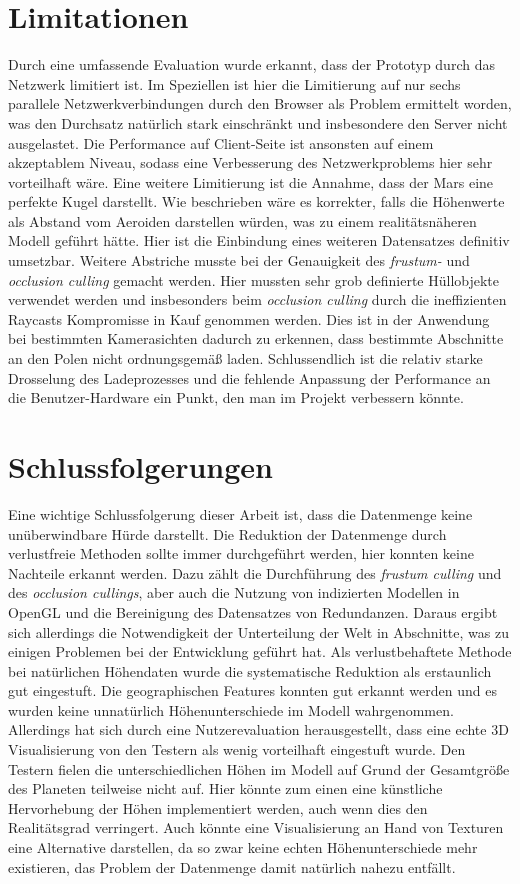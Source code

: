 \section{Limitationen}
Durch eine umfassende Evaluation wurde erkannt, dass der Prototyp durch das Netzwerk limitiert ist. Im Speziellen ist hier die Limitierung auf nur sechs parallele Netzwerkverbindungen durch den Browser als Problem ermittelt worden, was den Durchsatz natürlich stark einschränkt und insbesondere den Server nicht ausgelastet. Die Performance auf Client-Seite ist ansonsten auf einem akzeptablem Niveau, sodass eine Verbesserung des Netzwerkproblems hier sehr vorteilhaft wäre. Eine weitere Limitierung ist die Annahme, dass der Mars eine perfekte Kugel darstellt. Wie beschrieben wäre es korrekter, falls die Höhenwerte als Abstand vom Aeroiden darstellen würden, was zu einem realitätsnäheren Modell geführt hätte. Hier ist die Einbindung eines weiteren Datensatzes definitiv umsetzbar. Weitere Abstriche musste bei der Genauigkeit des \textit{frustum-} und \textit{occlusion culling} gemacht werden. Hier mussten sehr grob definierte Hüllobjekte verwendet werden und insbesonders beim \textit{occlusion culling} durch die ineffizienten Raycasts Kompromisse in Kauf genommen werden. Dies ist in der Anwendung bei bestimmten Kamerasichten dadurch zu erkennen, dass bestimmte Abschnitte an den Polen nicht ordnungsgemäß laden. Schlussendlich ist die relativ starke Drosselung des Ladeprozesses und die fehlende Anpassung der Performance an die Benutzer-Hardware ein Punkt, den man im Projekt verbessern könnte.

\section{Schlussfolgerungen}
Eine wichtige Schlussfolgerung dieser Arbeit ist, dass die Datenmenge keine unüberwindbare Hürde darstellt. Die Reduktion der Datenmenge durch verlustfreie Methoden sollte immer durchgeführt werden, hier konnten keine Nachteile erkannt werden. Dazu zählt die Durchführung des \textit{frustum culling} und des \textit{occlusion cullings}, aber auch die Nutzung von indizierten Modellen in OpenGL und die Bereinigung des Datensatzes von Redundanzen. Daraus ergibt sich allerdings die Notwendigkeit der Unterteilung der Welt in Abschnitte, was zu einigen Problemen bei der Entwicklung geführt hat. Als verlustbehaftete Methode bei natürlichen Höhendaten wurde die systematische Reduktion als erstaunlich gut eingestuft. Die geographischen Features konnten gut erkannt werden und es wurden keine unnatürlich Höhenunterschiede im Modell wahrgenommen. Allerdings hat sich durch eine Nutzerevaluation herausgestellt, dass eine echte 3D Visualisierung von den Testern als wenig vorteilhaft eingestuft wurde. Den Testern fielen die unterschiedlichen Höhen im Modell auf Grund der Gesamtgröße des Planeten teilweise nicht auf. Hier könnte zum einen eine künstliche Hervorhebung der Höhen implementiert werden, auch wenn dies den Realitätsgrad verringert. Auch könnte eine Visualisierung an Hand von Texturen eine Alternative darstellen, da so zwar keine echten Höhenunterschiede mehr existieren, das Problem der Datenmenge damit natürlich nahezu entfällt.

